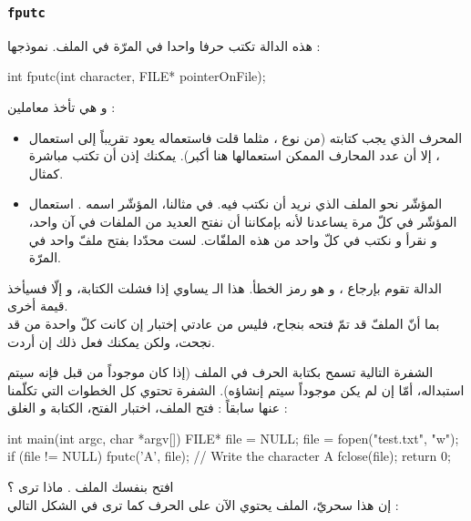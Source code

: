 \subsubsection{\texttt{fputc}}

هذه الدالة تكتب حرفا واحدا في المرّة في الملف. نموذجها :

\begin{Csource}
int fputc(int character, FILE* pointerOnFile);
\end{Csource}

و هي تأخذ معاملين :

\begin{itemize}
  \item المحرف الذي يجب كتابته (من نوع
،
مثلما قلت فاستعماله يعود تقريباً إلى استعمال
،
إلا أن عدد المحارف الممكن استعمالها هنا أكبر). يمكنك إذن أن تكتب مباشرة
كمثال.
  \item المؤشّر نحو الملف الذي نريد أن نكتب فيه. في مثالنا، المؤشّر اسمه
.
استعمال المؤشّر في كلّ مرة يساعدنا لأنه بإمكاننا أن نفتح العديد من الملفات في آن واحد، و نقرأ و نكتب في كلّ واحد من هذه الملفّات. لست محدّدا بفتح ملفّ واحد في المرّة.
\end{itemize}

الدالة تقوم بإرجاع
،
و هو رمز الخطأ. هذا الـ
يساوي
إذا فشلت الكتابة، و إلّا فسيأخذ قيمة أخرى.\\
بما أنّ الملفّ قد تمّ فتحه بنجاح، فليس من عادتي إختبار إن كانت كلّ واحدة من
قد نجحت، ولكن يمكنك فعل ذلك إن أردت.

الشفرة التالية تسمح بكتابة الحرف
في الملف
(إذا كان موجوداً من قبل فإنه سيتم استبداله، أمّا إن لم يكن موجوداً سيتم إنشاؤه). الشفرة تحتوي كل الخطوات التي تكلّمنا عنها سابقاً : فتح الملف، اختبار الفتح، الكتابة و الغلق :

\begin{Csource}
int main(int argc, char *argv[])
{
    FILE* file = NULL;
    file = fopen("test.txt", "w");
    if (file != NULL)
    {
        fputc('A', file); // Write the character A
        fclose(file);
    }
    return 0;
}
\end{Csource}

افتح بنفسك الملف
.
ماذا ترى ؟\\
إن هذا سحريّ، الملف يحتوي الآن على الحرف
كما ترى في الشكل التالي :


